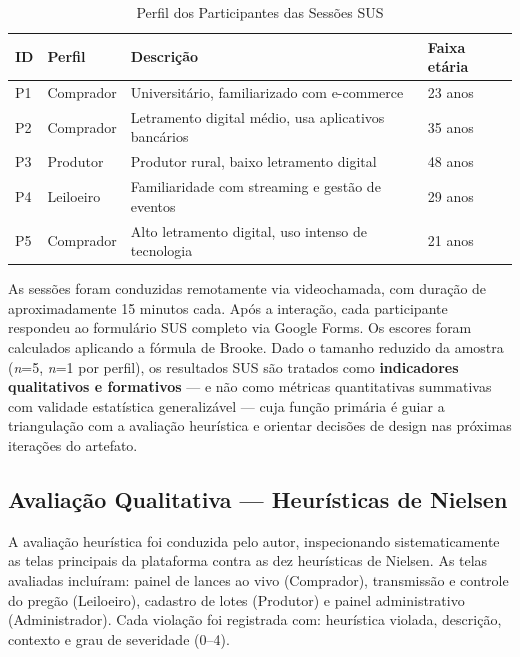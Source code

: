 \documentclass[12pt]{article}
\begin{document}
\begin{table}[h]
\centering
\caption{Perfil dos Participantes das Sessões SUS}
\label{tab:participantes}
\begin{tabularx}{\columnwidth}{llXl}
\toprule
\textbf{ID} & \textbf{Perfil} & \textbf{Descrição} & \textbf{Faixa etária} \\
\midrule
P1 & Comprador  & Universitário, familiarizado com e-commerce & 23 anos \\
P2 & Comprador  & Letramento digital médio, usa aplicativos bancários & 35 anos \\
P3 & Produtor   & Produtor rural, baixo letramento digital & 48 anos \\
P4 & Leiloeiro  & Familiaridade com streaming e gestão de eventos & 29 anos \\
P5 & Comprador  & Alto letramento digital, uso intenso de tecnologia & 21 anos \\
\bottomrule
\end{tabularx}
\end{table}

As sessões foram conduzidas remotamente via videochamada, com duração de
aproximadamente 15 minutos cada. Após a interação, cada participante respondeu ao
formulário SUS completo via Google Forms. Os escores foram calculados aplicando a
fórmula de Brooke. Dado o tamanho reduzido da amostra (\textit{n}=5, \textit{n}=1 por
perfil), os resultados SUS são tratados como \textbf{indicadores qualitativos e
formativos} --- e não como métricas quantitativas summativas com validade estatística
generalizável \cite{sauro2011} --- cuja função primária é guiar a triangulação com a
avaliação heurística e orientar decisões de design nas próximas iterações do artefato.

\subsection{Avaliação Qualitativa --- Heurísticas de Nielsen}

A avaliação heurística foi conduzida pelo autor, inspecionando sistematicamente as
telas principais da plataforma contra as dez heurísticas de Nielsen. As telas avaliadas
incluíram: painel de lances ao vivo (Comprador), transmissão e controle do pregão
(Leiloeiro), cadastro de lotes (Produtor) e painel administrativo (Administrador). Cada
violação foi registrada com: heurística violada, descrição, contexto e grau de
severidade (0--4).

\end{document}
